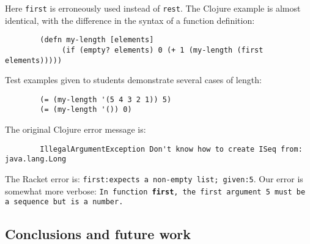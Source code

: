 \documentclass[submission,copyright,creativecommons]{eptcs}
\newcommand{\allcomments}[1]{{#1}}
\newcommand{\hfcomment}[1]{\textcolor{Teal}{\allcomments{Henry: {#1}}}}
\begin{document}
Here {\tt first} is erroneously used instead of {\tt rest}. The Clojure example is almost identical, with the difference in the syntax of a function definition: 
\begin{verbatim}
		(defn my-length [elements]
 			 (if (empty? elements) 0 (+ 1 (my-length (first elements)))))
\end{verbatim}
Test examples given to students demonstrate several cases of length: 
\begin{verbatim}
		(= (my-length '(5 4 3 2 1)) 5)
		(= (my-length '()) 0)
\end{verbatim}
The original Clojure error message is: 
\begin{verbatim}
		IllegalArgumentException Don't know how to create ISeq from: java.lang.Long 
\end{verbatim}
The Racket error is: {\tt first:expects a non-empty list; given:5}. Our error is somewhat more verbose: 
{\tt In function {\bf first}, the first argument 5 must be a sequence but is a number.}


	

\subsection{Conclusions and future work}\label{sec:future}



\end{document}

